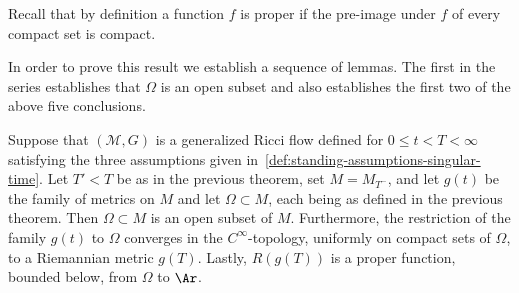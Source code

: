 \begin{remark}
\label{rem:proper-function}
Recall that by definition a function $f$ is proper if the pre-image
under $f$ of every compact set is compact.
\end{remark}





In order to prove this result we establish a sequence of lemmas. The
first in the series establishes that $\Omega$ is an open subset and
also establishes the first two of the above five conclusions.




\begin{lemma}
\label{lem:omega-open-limit-metric}
\label{Rproper}
Suppose that $({\mathcal M},G)$ is a generalized Ricci flow defined
for $0\le t<T<\infty$ satisfying the three assumptions given
in~\ref{def:standing-assumptions-singular-time}. Let $T'<T$ be as in the previous theorem, set
$M=M_{T^-}$, and let $g(t)$ be the family of metrics on $M$ and let
$\Omega\subset M$, each being  as defined in the previous theorem.
Then $\Omega\subset M$ is an open subset of $M$.
 Furthermore, the restriction of the family $g(t)$ to $\Omega$
 converges in the  $C^\infty$-topology, uniformly on compact sets of
 $\Omega$,
 to a Riemannian metric $g(T)$.
Lastly,  $R(g(T))$ is a proper function, bounded below, from
$\Omega$ to $\Ar$.
\end{lemma}


